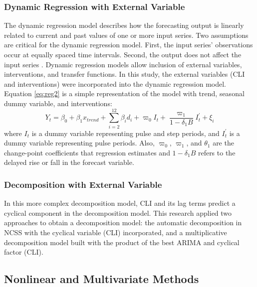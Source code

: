 \subsubsection{Dynamic Regression with External Variable}
The dynamic regression model describes how the forecasting output is linearly related to current and past values of one or more input series. Two assumptions are critical for the dynamic regression model. First, the input series' observations occur at equally spaced time intervals. Second, the output does not affect the input series \citep{pankratz2012}. Dynamic regression models allow inclusion of   external variables, interventions, and transfer functions. In this study, the external variables (CLI and interventions) were incorporated into the dynamic regression model. Equation \ref{eq:reg2} is a simple representation of the model with trend, seasonal dummy variable, and interventions:
\begin{equation}
Y_t = \beta_0+\beta_1 x_{trend} + \sum_{i=2}^{12} {\beta_i d_i}+\varpi_0 I_t +\frac{\varpi_1}{1-\delta_1 B} I^{'}_t +\xi_i
\label{eq:reg2}
\end{equation}
where $I_t$ is a dummy variable representing pulse and step periods, and $I^{'}_t$ is a dummy variable representing pulse periods. Also, $\varpi_0$, $\varpi_1$, and $\theta_1$ are the change-point coefficients that regression estimates and $1-\delta_1 B$ refers to the delayed rise or fall in the forecast variable.
  
\subsubsection{Decomposition with External Variable}
In this more complex decomposition model, CLI and its lag terms predict   a cyclical component in the decomposition model. This research applied two approaches to obtain a decomposition model: the automatic decomposition in NCSS with the cyclical variable (CLI) incorporated, and a multiplicative decomposition model built with the product of the best ARIMA and cyclical factor (CLI). 
\subsection{Nonlinear and Multivariate Methods}
